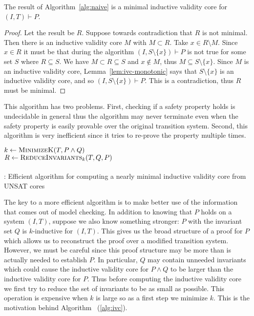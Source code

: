 \begin{lemma}
  The result of Algorithm~\ref{alg:naive} is a minimal inductive validity core
  for $(I, T)\vdash P$.
\end{lemma}
\begin{proof}
  Let the result be $R$. Suppose towards contradiction that $R$ is not
  minimal. Then there is an inductive validity core $M$ with $M
  \subset R$. Take $x \in R\setminus M$. Since $x \in R$ it must be
  that during the algorithm $(I, S\setminus\{x\})\vdash P$ is not true
  for some set $S$ where $R \subseteq S$. We have $M \subset R
  \subseteq S$ and $x\not\in M$, thus $M \subseteq S\setminus \{x\}$.
  Since $M$ is an inductive validity core,
  Lemma~\ref{lem:ivc-monotonic} says that $S\setminus \{x\}$ is an
  inductive validity core, and so $(I, S\setminus\{x\})\vdash P$. This
  is a contradiction, thus $R$ must be minimal.
\end{proof}

This algorithm has two problems. First, checking if a safety property
holds is undecidable in general thus the algorithm may never terminate
even when the safety property is easily provable over the original
transition system. Second, this algorithm is very inefficient since it
tries to re-prove the property multiple times.

\begin{algorithm}[t]
  \BlankLine
  $k \leftarrow \textsc{MinimizeK}(T, P \land Q)$ \\
  $R \leftarrow \textsc{ReduceInvariants}_k(T, Q, P)$ \\
  \\
\caption{\ucalg: Efficient algorithm for computing a nearly minimal inductive validity core from UNSAT cores}
\label{alg:ivc}
\end{algorithm}

The key to a more efficient algorithm is to make better use of the
information that comes out of model checking. In addition to knowing
that $P$ holds on a system $(I, T)$, suppose we also know something
stronger: $P$ with the invariant set $Q$ is $k$-inductive for $(I,
T)$. This gives us the broad structure of a proof for $P$ which allows
us to reconstruct the proof over a modified transition system.
However, we must be careful since this proof structure may be more
than is actually needed to establish $P$. In particular, $Q$ may
contain unneeded invariants which could cause the inductive validity
core for $P \land Q$ to be larger than the inductive validity core for
$P$. Thus before computing the inductive validity core we first try to
reduce the set of invariants to be as small as possible. This
operation is expensive when $k$ is large so as a first step we
minimize $k$. This is the motivation behind
Algorithm \ucalg~(\ref{alg:ivc}).

